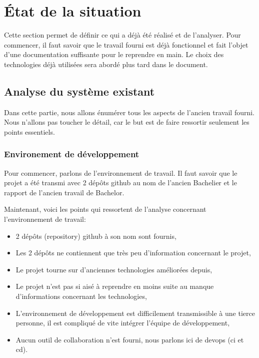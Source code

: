 \documentclass[
    iai, %
    il, %
]{heig-tb}
\begin{document}
\section{État de la situation}
Cette section permet de définir ce qui a déjà été réalisé et de l'analyser.\newline
Pour commencer, il faut savoir que le travail fourni est déjà fonctionnel et fait l'objet d'une documentation suffisante pour le reprendre en main.\newline
Le choix des technologies déjà utilisées sera abordé plus tard dans le document.

\subsection{Analyse du système existant}
Dans cette partie, nous allons énumérer tous les aspects de l'ancien travail fourni. Nous n'allons pas toucher le détail, car le but est de faire ressortir seulement les points essentiels.

\subsubsection{Environement de développement}
Pour commencer, parlons de l'environnement de travail. Il faut savoir que le projet a été transmi avec 2 dépôts \Gls{github} au nom de l'ancien Bachelier et le rapport de l'ancien travail de Bachelor.

Maintenant, voici les points qui ressortent de l'analyse concernant l'environnement de travail:
\begin{itemize}
    \item 2 dépôts (repository) \Gls{github} à son nom sont fournis,
    \item Les 2 dépôts ne contiennent que très peu d'information concernant le projet,
    \item Le projet tourne sur d'anciennes technologies améliorées depuis,
    \item Le projet n'est pas si aisé à reprendre en moins suite au manque d'informations concernant les technologies,
    \item L'environnement de développement est difficilement transmissible à une tierce personne, il est compliqué de vite intégrer l'équipe de développement,
    \item Aucun outil de collaboration n'est fourni, nous parlons ici de \Gls{devops} (\Gls{ci} et \Gls{cd}).
\end{itemize}
\end{document}
